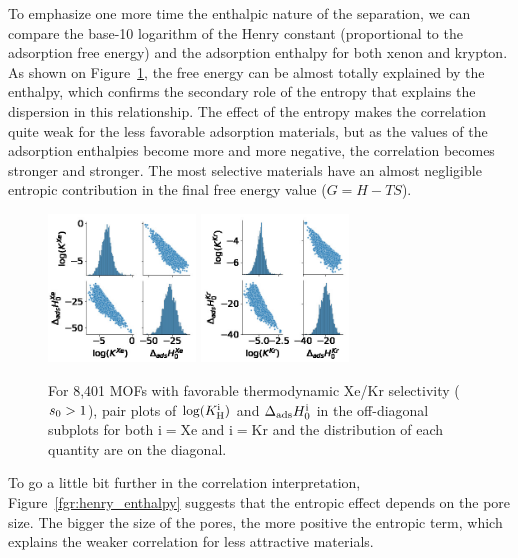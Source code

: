 \documentclass[main.tex]{subfiles}
\begin{document}
To emphasize one more time the enthalpic nature of the separation, we can compare the base-10 logarithm of the Henry constant (proportional to the adsorption free energy) and the adsorption enthalpy for both xenon and krypton. As shown on Figure~\ref{fgr:SI:HK}, the free energy can be almost totally explained by the enthalpy, which confirms the secondary role of the entropy that explains the dispersion in this relationship. The effect of the entropy makes the correlation quite weak for the less favorable adsorption materials, but as the values of the adsorption enthalpies become more and more negative, the correlation becomes stronger and stronger. The most selective materials have an almost negligible entropic contribution in the final free energy value ($G=H-TS$).

\begin{figure}[ht]
  \centering
    \includegraphics[width=0.35\textwidth]{figures/2-thermo/H_K_Xe.jpg}
    \includegraphics[width=0.35\textwidth]{figures/2-thermo/H_K_Kr.jpg}
    \caption{For 8,401 MOFs with favorable thermodynamic Xe/Kr selectivity ($s_{\text{0}} > 1$), pair plots of $\log(K_{\text{H}}^{\text{i}})$ and $\Delta_{\text{ads}}H^{\text{i}}_{\text{0}}$ in the off-diagonal subplots for both i$=$Xe and i$=$Kr and the distribution of each quantity are on the diagonal.}\label{fgr:SI:HK}
\end{figure}

To go a little bit further in the correlation interpretation, Figure~\ref{fgr:henry_enthalpy} suggests that the entropic effect depends on the pore size. The bigger the size of the pores, the more positive the entropic term, which explains the weaker correlation for less attractive materials. 
\end{document}
